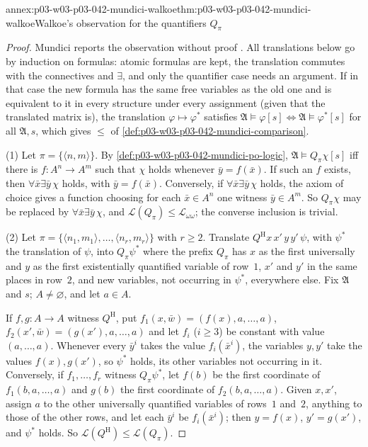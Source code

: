 \begin{annexitem}{annex:p03-w03-p03-042-mundici-walkoe}{thm:p03-w03-p03-042-mundici-walkoe}{Walkoe's observation for the quantifiers \(Q_\pi\)}
\begin{proof}
Mundici reports the observation without proof
\cite[p.~213]{Mundici1985OtherQuantifiers}.  All translations below go by
induction on formulas: atomic formulas are kept, the translation commutes
with the connectives and \(\exists\), and only the quantifier case needs
an argument.  If in that case the new formula has the same free variables
as the old one and is equivalent to it in every structure under every
assignment (given that the translated matrix is), the translation
\(\varphi\mapsto\varphi^\ast\) satisfies
\(\mathfrak A\models\varphi[s]\iff\mathfrak A\models\varphi^\ast[s]\) for
all \(\mathfrak A,s\), which gives \(\leq\) of
\cref{def:p03-w03-p03-042-mundici-comparison}.

(1) Let \(\pi=\{\langle n,m\rangle\}\).  By
\cref{def:p03-w03-p03-042-mundici-po-logic}, \(\mathfrak A\models
Q_\pi\chi[s]\) iff there is \(f:A^n\to A^m\) such that \(\chi\) holds
whenever \(\bar y=f(\bar x)\).  If such an \(f\) exists, then
\(\forall\bar x\exists\bar y\,\chi\) holds, with \(\bar y=f(\bar x)\).
Conversely, if \(\forall\bar x\exists\bar y\,\chi\) holds, the axiom of
choice gives a function choosing for each \(\bar x\in A^n\) one witness
\(\bar y\in A^m\).  So \(Q_\pi\chi\) may be replaced by
\(\forall\bar x\exists\bar y\,\chi\), and \(\mathscr
L(Q_\pi)\leq\mathscr L_{\omega\omega}\); the converse inclusion is
trivial.

(2) Let \(\pi=\{\langle n_1,m_1\rangle,\ldots,\langle n_r,m_r\rangle\}\)
with \(r\geq2\).  Translate \(Q^{\mathrm H}x\,x'\,y\,y'\,\psi\), with
\(\psi^\ast\) the translation of \(\psi\), into \(Q_\pi\psi^\ast\) where
the prefix \(Q_\pi\) has \(x\) as the first universally and \(y\) as the
first existentially quantified variable of row~\(1\), \(x'\) and \(y'\) in
the same places in row~\(2\), and new variables, not occurring in
\(\psi^\ast\), everywhere else.  Fix \(\mathfrak A\) and \(s\); \(A\neq
\varnothing\), and let \(a\in A\).

If \(f,g:A\to A\) witness \(Q^{\mathrm H}\), put
\(f_1(x,\bar w)=(f(x),a,\ldots,a)\), \(f_2(x',\bar w)=(g(x'),a,\ldots,a)\)
and let \(f_i\) (\(i\geq3\)) be constant with value \((a,\ldots,a)\).
Whenever every \(\bar y^i\) takes the value \(f_i(\bar x^i)\), the
variables \(y,y'\) take the values \(f(x),g(x')\), so \(\psi^\ast\) holds,
its other variables not occurring in it.  Conversely, if \(f_1,\ldots,f_r\)
witness \(Q_\pi\psi^\ast\), let \(f(b)\) be the first coordinate of
\(f_1(b,a,\ldots,a)\) and \(g(b)\) the first coordinate of
\(f_2(b,a,\ldots,a)\).  Given \(x,x'\), assign \(a\) to the other
universally quantified variables of rows~\(1\) and~\(2\), anything to
those of the other rows, and let each \(\bar y^i\) be \(f_i(\bar x^i)\);
then \(y=f(x)\), \(y'=g(x')\), and \(\psi^\ast\) holds.  So \(\mathscr
L(Q^{\mathrm H})\leq\mathscr L(Q_\pi)\).


\end{proof}
\end{annexitem}
